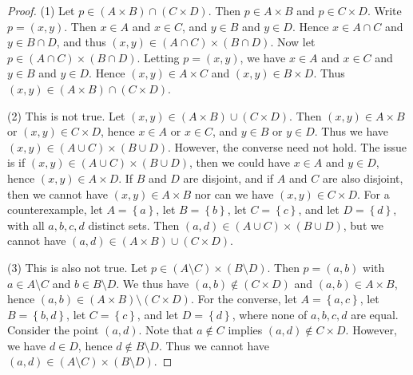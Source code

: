 \documentclass[11pt, letterpaper]{article}
\theoremstyle{definition}
\begin{document}
\begin{proof}
	(1) Let $p\in (A\times B)\cap (C\times D)$. Then $p\in A\times B$ and $p\in C\times D$. Write $p=(x,y)$. Then $x\in A$ and $x\in C$, and $y\in B$ and $y\in D$. Hence $x\in A \cap C$ and $y\in B \cap D$, and thus $(x,y)\in (A \cap C)\times (B \cap D)$. Now let $p\in (A \cap C)\times (B \cap D)$. Letting $p=(x,y)$, we have $x\in A$ and $x\in C$ and $y\in B$ and $y\in D$. Hence $(x,y)\in A \times C$ and $(x,y)\in B \times D$. Thus $(x,y)\in (A \times B)\cap (C\times D)$.

	(2) This is not true. Let $(x,y)\in (A\times B)\cup (C\times D)$. Then $(x,y)\in A\times B$ or $(x,y)\in C\times D$, hence $x\in A$ or $x\in C$, and $y\in B$ or $y\in D$. Thus we have $(x,y)\in (A \cup C)\times (B \cup D)$. However, the converse need not hold. The issue is if $(x,y)\in (A \cup C)\times (B \cup D)$, then we could have $x\in A$ and $y\in D$, hence $(x,y)\in A \times D$. If $B$ and $D$ are disjoint, and if $A$ and $C$ are also disjoint, then we cannot have $(x,y)\in A \times B$ nor can we have $(x,y)\in C\times D$. For a counterexample, let $A=\left\{ a \right\} $, let $B=\left\{ b \right\} $, let $C=\left\{ c \right\} $, and let $D=\left\{ d \right\} $, with all $a,b,c,d$ distinct sets. Then $(a,d)\in (A \cup C)\times (B \cup D)$, but we cannot have $(a,d)\in (A\times B)\cup (C\times D)$.

	(3) This is also not true. Let $p\in (A\setminus C)\times (B\setminus D)$. Then $p=(a,b)$ with $a\in A\setminus C$ and $b\in B\setminus D$. We thus have $(a,b)\notin (C\times D)$ and $(a,b)\in A\times B$, hence $(a,b)\in (A\times B)\setminus (C\times D)$. For the converse, let $A=\left\{ a,c \right\} $, let $B=\left\{ b,d \right\} $, let $C=\left\{ c \right\} $, and let $D=\left\{ d \right\} $, where none of $a,b,c,d$ are equal. Consider the point $(a,d)$. Note that $a\notin C$ implies $(a,d)\notin C\times D$. However, we have $d\in D$, hence $d\notin B\setminus D$. Thus we cannot have $(a,d)\in (A\setminus C)\times (B\setminus D)$.
\end{proof}
\end{document}
